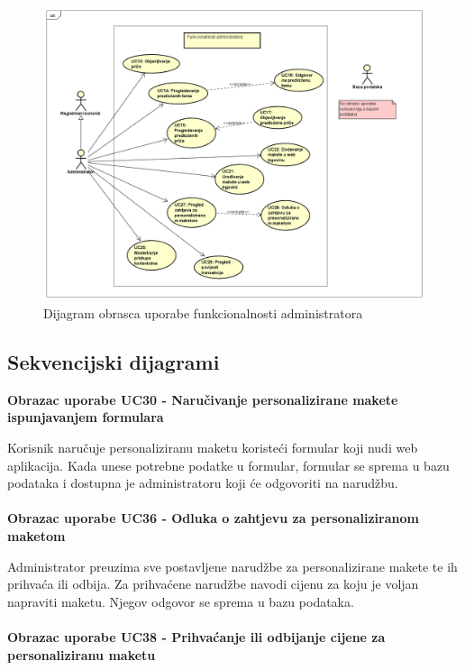 					\begin{figure}
						\centering
						\includegraphics[scale=0.34]{"slike/Funkcionalnost administratora"}
						\caption{Dijagram obrasca uporabe funkcionalnosti administratora}
						\label{fig:funkcionalnost-administratora}
					\end{figure}
					
					
				\eject		
				
			\subsection{Sekvencijski dijagrami}
				
				\textbf{Obrazac uporabe UC30 - Naručivanje personalizirane makete ispunjavanjem formulara}
				
				Korisnik naručuje personaliziranu maketu koristeći formular koji nudi web aplikacija. Kada unese potrebne podatke u formular, formular se sprema u bazu podataka i dostupna je administratoru koji će odgovoriti na narudžbu.\\
				\\
				\textbf{Obrazac uporabe UC36 - Odluka o zahtjevu za personaliziranom maketom}
				
				Administrator preuzima sve postavljene narudžbe za personalizirane makete te ih prihvaća ili odbija. Za prihvaćene narudžbe navodi cijenu za koju je voljan napraviti maketu. Njegov odgovor se sprema u bazu podataka. \\
				\\
				\textbf{Obrazac uporabe UC38 - Prihvaćanje ili odbijanje cijene za personaliziranu maketu}
				
